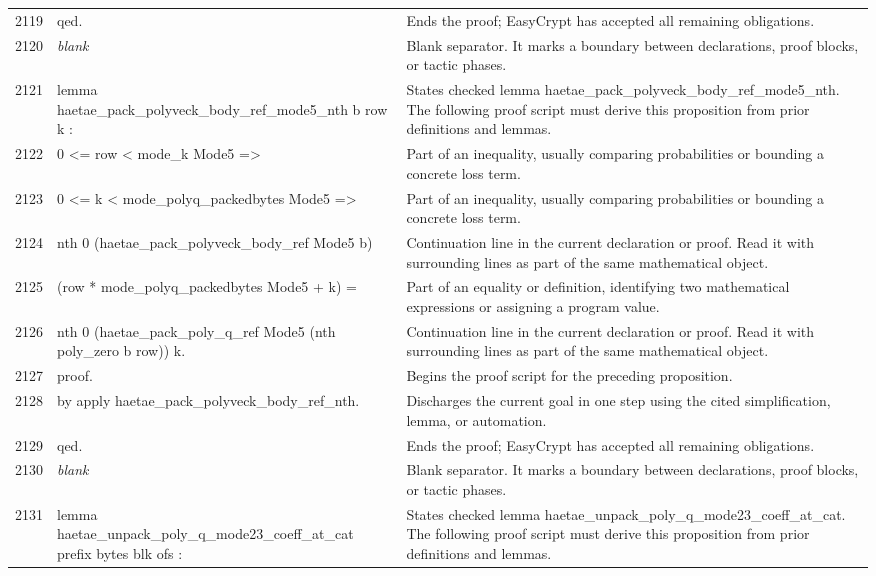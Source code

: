 \documentclass[10pt]{article}
\begin{document}
\begin{longtable}{r L{0.53\textwidth} L{0.37\textwidth}}
2119 & {\ttfamily\scriptsize qed.} & Ends the proof; EasyCrypt has accepted all remaining obligations. \\
2120 & {\ttfamily\scriptsize \emph{blank}} & Blank separator.  It marks a boundary between declarations, proof blocks, or tactic phases. \\
2121 & {\ttfamily\scriptsize lemma haetae\_pack\_polyveck\_body\_ref\_mode5\_nth b row k :} & States checked lemma haetae\_pack\_polyveck\_body\_ref\_mode5\_nth.  The following proof script must derive this proposition from prior definitions and lemmas. \\
2122 & {\ttfamily\scriptsize   0 <= row < mode\_k Mode5 =>} & Part of an inequality, usually comparing probabilities or bounding a concrete loss term. \\
2123 & {\ttfamily\scriptsize   0 <= k < mode\_polyq\_packedbytes Mode5 =>} & Part of an inequality, usually comparing probabilities or bounding a concrete loss term. \\
2124 & {\ttfamily\scriptsize   nth 0 (haetae\_pack\_polyveck\_body\_ref Mode5 b)} & Continuation line in the current declaration or proof.  Read it with surrounding lines as part of the same mathematical object. \\
2125 & {\ttfamily\scriptsize     (row * mode\_polyq\_packedbytes Mode5 + k) =} & Part of an equality or definition, identifying two mathematical expressions or assigning a program value. \\
2126 & {\ttfamily\scriptsize   nth 0 (haetae\_pack\_poly\_q\_ref Mode5 (nth poly\_zero b row)) k.} & Continuation line in the current declaration or proof.  Read it with surrounding lines as part of the same mathematical object. \\
2127 & {\ttfamily\scriptsize proof.} & Begins the proof script for the preceding proposition. \\
2128 & {\ttfamily\scriptsize by apply haetae\_pack\_polyveck\_body\_ref\_nth.} & Discharges the current goal in one step using the cited simplification, lemma, or automation. \\
2129 & {\ttfamily\scriptsize qed.} & Ends the proof; EasyCrypt has accepted all remaining obligations. \\
2130 & {\ttfamily\scriptsize \emph{blank}} & Blank separator.  It marks a boundary between declarations, proof blocks, or tactic phases. \\
2131 & {\ttfamily\scriptsize lemma haetae\_unpack\_poly\_q\_mode23\_coeff\_at\_cat prefix bytes blk ofs :} & States checked lemma haetae\_unpack\_poly\_q\_mode23\_coeff\_at\_cat.  The following proof script must derive this proposition from prior definitions and lemmas. \\

\end{longtable}
\end{document}
